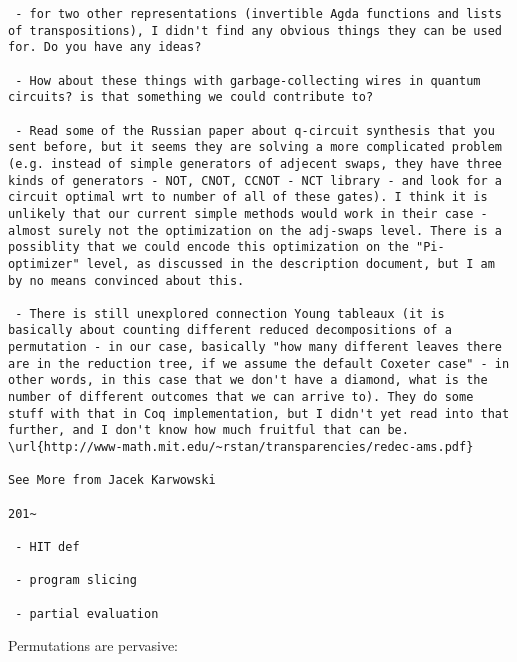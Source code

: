 \documentclass{article}
\begin{document}
\begin{verbatim}
 - for two other representations (invertible Agda functions and lists of transpositions), I didn't find any obvious things they can be used for. Do you have any ideas?

 - How about these things with garbage-collecting wires in quantum circuits? is that something we could contribute to? 

 - Read some of the Russian paper about q-circuit synthesis that you sent before, but it seems they are solving a more complicated problem (e.g. instead of simple generators of adjecent swaps, they have three kinds of generators - NOT, CNOT, CCNOT - NCT library - and look for a circuit optimal wrt to number of all of these gates). I think it is unlikely that our current simple methods would work in their case - almost surely not the optimization on the adj-swaps level. There is a possiblity that we could encode this optimization on the "Pi-optimizer" level, as discussed in the description document, but I am by no means convinced about this.

 - There is still unexplored connection Young tableaux (it is basically about counting different reduced decompositions of a permutation - in our case, basically "how many different leaves there are in the reduction tree, if we assume the default Coxeter case" - in other words, in this case that we don't have a diamond, what is the number of different outcomes that we can arrive to). They do some stuff with that in Coq implementation, but I didn't yet read into that further, and I don't know how much fruitful that can be.  
\url{http://www-math.mit.edu/~rstan/transparencies/redec-ams.pdf}

See More from Jacek Karwowski

201~

 - HIT def

 - program slicing

 - partial evaluation

 \end{verbatim}

Permutations are pervasive:
\end{document}
